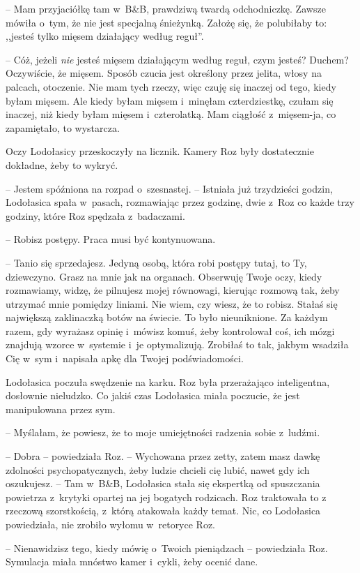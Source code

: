 \documentclass[oneside,polish,11pt,sfheadings]{mwbk}
\begin{document}
-- Mam przyjaciółkę tam w~B\&B, prawdziwą twardą odchodniczkę. Zawsze
mówiła o~tym, że nie jest specjalną śnieżynką. Założę się, że polubiłaby
to: ,,jesteś tylko mięsem działający według reguł''.

-- Cóż, jeżeli \textit{nie} jesteś mięsem działającym według reguł, czym
jesteś? Duchem? Oczywiście, że mięsem. Sposób czucia jest określony
przez jelita, włosy na palcach, otoczenie. Nie mam tych rzeczy, więc
czuję się inaczej od tego, kiedy byłam mięsem. Ale kiedy byłam mięsem i~minęłam czterdziestkę, czułam się inaczej, niż kiedy byłam mięsem i~czterolatką. Mam ciągłość z~mięsem-ja, co zapamiętało, to wystarcza.

Oczy Lodołasicy przeskoczyły na licznik. Kamery Roz były dostatecznie
dokładne, żeby to wykryć. 

-- Jestem spóźniona na rozpad o~szesnastej. -- Istniała już trzydzieści godzin, Lodołasica spała w~pasach, rozmawiając
przez godzinę, dwie z~Roz co każde trzy godziny, które Roz spędzała z~badaczami.

-- Robisz postępy. Praca musi być kontynuowana.

-- Tanio się sprzedajesz. Jedyną osobą, która robi postępy tutaj, to Ty,
dziewczyno. Grasz na mnie jak na organach. Obserwuję Twoje oczy, kiedy
rozmawiamy, widzę, że pilnujesz mojej równowagi, kierując rozmową tak,
żeby utrzymać mnie pomiędzy liniami. Nie wiem, czy wiesz, że to robisz.
Stałaś się największą zaklinaczką botów na świecie. To było
nieuniknione. Za każdym razem, gdy wyrażasz opinię i~mówisz komuś, żeby
kontrolował coś, ich mózgi znajdują wzorce w~systemie i~je optymalizują.
Zrobiłaś to tak, jakbym wsadziła Cię w~sym i~napisała apkę dla Twojej
podświadomości.

Lodołasica poczuła swędzenie na karku. Roz była przerażająco
inteligentna, dosłownie nieludzko. Co jakiś czas Lodołasica miała
poczucie, że jest manipulowana przez sym. 

-- Myślałam, że powiesz, że to
moje umiejętności radzenia sobie z~ludźmi.

-- Dobra -- powiedziała Roz. -- Wychowana przez zetty, zatem masz dawkę
zdolności psychopatycznych, żeby ludzie chcieli cię lubić, nawet gdy ich
oszukujesz. -- Tam w~B\&B, Lodołasica stała się ekspertką od spuszczania
powietrza z~krytyki opartej na jej bogatych rodzicach. Roz traktowała to
z rzeczową szorstkością, z~którą atakowała każdy temat. Nic, co
Lodołasica powiedziała, nie zrobiło wyłomu w~retoryce Roz. 

-- Nienawidzisz tego, kiedy mówię o~Twoich pieniądzach -- powiedziała Roz.
Symulacja miała mnóstwo kamer i~cykli, żeby ocenić dane.
\end{document}
